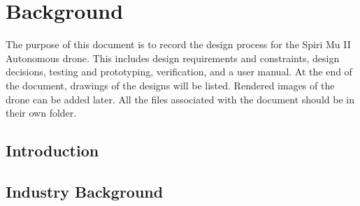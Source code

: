 \chapter{Background}
The purpose of this document is to record the design process for the Spiri Mu II Autonomous drone. This includes design requirements and constraints, design decisions, testing and prototyping, verification, and a user manual.
At the end of the document, drawings of the designs will be listed. Rendered images of the drone can be added later.
All the files associated with the document should be in their own folder.
\section{Introduction}

\section{Industry Background}

